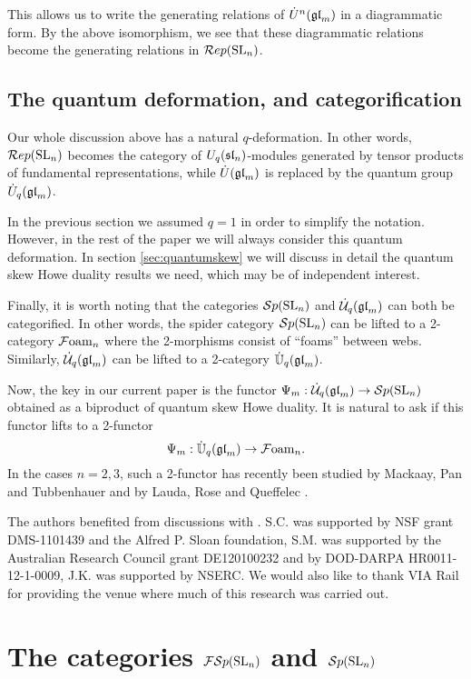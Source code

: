 \documentclass[11pt]{amsart}
\begin{document}
This allows us to write the generating relations of $\dot{U}^n(\gl_m) $ in a diagrammatic form. By the above isomorphism, we see that these diagrammatic relations become the generating relations in $\Rep(\SL_n)$. 

\subsection{The quantum deformation, and categorification}

Our whole discussion above has a natural $q$-deformation. In other words, $\Rep(\SL_n)$ becomes the category of $U_q(\sl_n)$-modules generated by tensor products of fundamental representations, while ${\dot U}(\gl_m)$ is replaced by the quantum group $\dalg(\gl_m)$. 

In the previous section we assumed $q=1$ in order to simplify the notation. However, in the rest of the paper we will always consider this quantum deformation. In section \ref{sec:quantumskew} we will discuss in detail the quantum skew Howe duality results we need, which may be of independent interest.

Finally, it is worth noting that the categories $\Sp(\SL_n)$ and $\dU(\gl_m)$ can both be categorified. In other words, the spider category $\Sp(\SL_n)$ can be lifted to a 2-category $\Foam_n$ where the 2-morphisms consist of ``foams'' between webs. Similarly, $\dU(\gl_m)$ can be lifted to a 2-category $\dot{\mathbb{U}}_q(\gl_m)$. 

Now, the key in our current paper is the functor $\Psi_m: \dU(\gl_m) \rightarrow \Sp(\SL_n)$ obtained as a biproduct of quantum skew Howe duality. It is natural to ask if this functor lifts to a 2-functor
$$\Psi_m: \dot{\mathbb{U}}_q(\gl_m) \rightarrow \Foam_n.$$
In the cases $n=2,3$, such a 2-functor has recently been studied by Mackaay, Pan and Tubbenhauer \cite{1206.2118} and by Lauda, Rose and Queffelec \cite{LRQ}. 

\vspace{.5cm}

The authors benefited from discussions with . S.C. was supported by NSF grant DMS-1101439 and the Alfred P. Sloan foundation, S.M. was supported by the Australian Research Council grant DE120100232 and by DOD-DARPA HR0011-12-1-0009, J.K. was supported by NSERC.  We would also like to thank VIA Rail for providing the venue where much of this research was carried out. 

\section{The categories \texorpdfstring{$\FSp(\SL_n)$}{FSp(SL\_n)} and \texorpdfstring{$\Sp(\SL_n)$}{Sp(SL\_n)}}\label{sec:diagrams}
\end{document}
